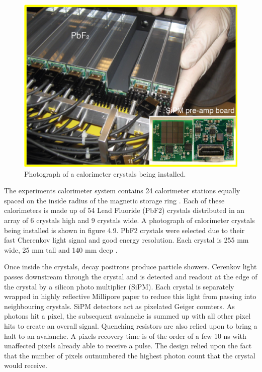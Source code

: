 \begin{figure}[th]
\centering
\includegraphics[scale=1.4]{Figures/calorimeterphoto}
\decoRule
\caption{Photograph of a calorimeter crystals being installed.}
\label{fig:calorimeterphoto}
\end{figure}

The experiments calorimeter system contains 24 calorimeter stations equally spaced on the inside radius of the magnetic storage ring \cite{Reference24}. Each of these calorimeters is made up of 54 Lead Fluoride (PbF2) crystals distributed in an array of 6 crystals high and 9 crystals wide. A photograph of calorimeter crystals being installed is shown in figure 4.9. PbF2 crystals were selected due to their fast Cherenkov light signal and good energy resolution. Each crystal is 255 mm wide, 25 mm tall and 140 mm deep \cite{calref1}.

Once inside the crystals, decay positrons produce particle showers. Cerenkov light passes downstream through the crystal and is detected and readout at the edge of the crystal by a silicon photo multiplier (SiPM). Each crystal is separately wrapped in highly reflective Millipore paper to reduce this light from passing into neighbouring crystals. SiPM detectors act as pixelated Geiger counters. As photons hit a pixel, the subsequent avalanche is summed up with all other pixel hits to create an overall signal. Quenching resistors are also relied upon to bring a halt to an avalanche. A pixels recovery time is of the order of a few 10 ns with unaffected pixels already able to receive a pulse. The design relied upon the fact that the number of pixels outnumbered the highest photon count that the crystal would receive.

